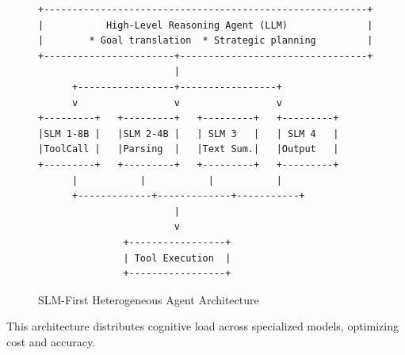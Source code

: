 \documentclass[11pt,a4paper]{article}
\begin{document}
\begin{figure}[H]
\centering
\begin{verbatim}
+---------------------------------------------------------+
|           High-Level Reasoning Agent (LLM)              |
|        * Goal translation  * Strategic planning         |
+-----------------------+---------------------------------+
                        |
      +-----------------+-----------------+
      v                 v                 v
+---------+   +---------+   +---------+   +---------+
|SLM 1-8B |   |SLM 2-4B |   | SLM 3   |   | SLM 4   |
|ToolCall |   |Parsing  |   |Text Sum.|   |Output   |
+---------+   +---------+   +---------+   +---------+
      |           |           |           |
      +-------------+-------------+-----------+
                        |
                        v
               +-----------------+
               | Tool Execution  |
               +-----------------+
\end{verbatim}
\caption{SLM-First Heterogeneous Agent Architecture~\cite{nvidia2025}}
\end{figure}
This architecture distributes cognitive load across specialized models, optimizing cost and accuracy. \cite{nvidia2025}
\end{document}

